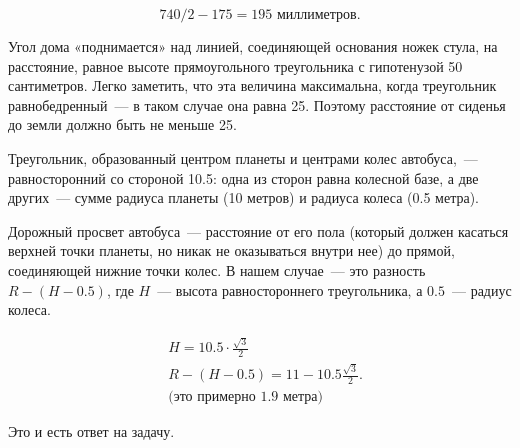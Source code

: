 ﻿
\begin{itemize}

\itA $$740/2-175 = 195\text{\ миллиметров.}$$

\itB Угол дома «поднимается» над линией, соединяющей основания ножек стула, на расстояние, равное высоте прямоугольного треугольника с гипотенузой 50 сантиметров. Легко заметить, что эта величина максимальна, когда треугольник равнобедренный~— в таком случае она равна \SI{25}{}. Поэтому расстояние от сиденья до земли должно быть не меньше \SI{25}{}.

\begin{center}  \end{center}

\itC Треугольник, образованный центром планеты и центрами колес автобуса,~— равносторонний со стороной \SI{10.5}{}: одна из сторон равна колесной базе, а две других~— сумме радиуса планеты (10 метров) и радиуса колеса (0.5 метра).

\begin{center}
\end{center}

Дорожный просвет автобуса~— расстояние от его пола (который должен касаться верхней точки планеты, но никак не оказываться внутри нее) до прямой, соединяющей нижние точки колес. В нашем случае~— это разность $R-(H-0.5)$, где $H$~— высота равностороннего треугольника, а $0.5$~— радиус колеса.

\begin{align*}
	& H = 10.5 \cdot \frac{\sqrt{3}}{2} \\
	& R-(H-0.5) = 11 - 10.5\frac{\sqrt{3}}{2}. \\
	& \text{(это примерно 1.9 метра)}
\end{align*}

Это и есть ответ на задачу.
\end{itemize}